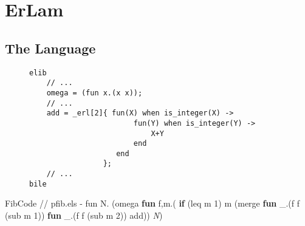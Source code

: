 \section{ErLam}

\subsection{The Language}

\begin{slide}
    \begin{figure}
    \centering
        {\footnotesize
            
        }
    \label{fig:grammer}
    \end{figure}

\end{slide}

\begin{slide}
    \begin{figure}
    \centering
    \begin{BVerbatim}
elib
    // ...
    omega = (fun x.(x x));
    // ...
    add = _erl[2]{ fun(X) when is_integer(X) ->
                        fun(Y) when is_integer(Y) ->
                            X+Y
                        end
                    end
                 };
    // ...
bile
    \end{BVerbatim}
    \end{figure}

\end{slide}

\begin{SaveVerbatim}[commandchars=\\\{\}]{FibCode}
// pfib.els -
fun N.
    (omega \textbf{fun} f,m.(
        \textbf{if} (leq m 1) 
           m
           (merge \textbf{fun} _.(f f (sub m 1))
                  \textbf{fun} _.(f f (sub m 2))
                  add)) \textit{N})
\end{SaveVerbatim}

